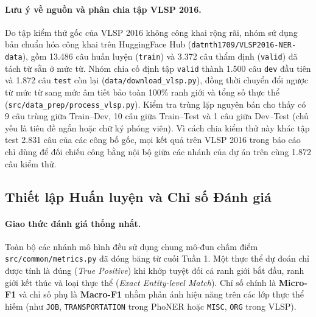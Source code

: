 \paragraph{Lưu ý về nguồn và phân chia tập VLSP 2016.}
Do tập kiểm thử gốc của VLSP 2016 không công khai rộng rãi, nhóm sử dụng bản chuẩn hóa công khai trên HuggingFace Hub (\texttt{datnth1709/VLSP2016-NER-data}), gồm 13.486 câu huấn luyện (\texttt{train}) và 3.372 câu thẩm định (\texttt{valid}) đã tách từ sẵn ở mức từ. Nhóm chia cố định tập \texttt{valid} thành 1.500 câu \texttt{dev} đầu tiên và 1.872 câu \texttt{test} còn lại (\texttt{data/download\_vlsp.py}), đồng thời chuyển đổi ngược từ mức từ sang mức âm tiết bảo toàn 100\% ranh giới và tổng số thực thể (\texttt{src/data\_prep/process\_vlsp.py}). Kiểm tra trùng lặp nguyên bản cho thấy có 9 câu trùng giữa Train--Dev, 10 câu giữa Train--Test và 1 câu giữa Dev--Test (chủ yếu là tiêu đề ngắn hoặc chữ ký phóng viên). Vì cách chia kiểm thử này khác tập test 2.831 câu của các công bố gốc, mọi kết quả trên VLSP 2016 trong báo cáo chỉ dùng để đối chiếu công bằng nội bộ giữa các nhánh của dự án trên cùng 1.872 câu kiểm thử.

\subsection{Thiết lập Huấn luyện và Chỉ số Đánh giá}
\label{sec:exp-setup}

\paragraph{Giao thức đánh giá thống nhất.}
Toàn bộ các nhánh mô hình đều sử dụng chung mô-đun chấm điểm \texttt{src/common/metrics.py} đã đóng băng từ cuối Tuần 1. Một thực thể dự đoán chỉ được tính là đúng (\textit{True Positive}) khi khớp tuyệt đối cả ranh giới bắt đầu, ranh giới kết thúc và loại thực thể (\textit{Exact Entity-level Match}). Chỉ số chính là \textbf{Micro-F1} và chỉ số phụ là \textbf{Macro-F1} nhằm phản ánh hiệu năng trên các lớp thực thể hiếm (như \texttt{JOB}, \texttt{TRANSPORTATION} trong PhoNER hoặc \texttt{MISC}, \texttt{ORG} trong VLSP).

